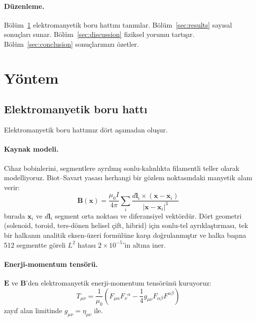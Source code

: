 \documentclass[11pt,a4paper,twocolumn]{article}
\begin{document}
\paragraph{Düzenleme.} Bölüm~\ref{sec:method} elektromanyetik boru
hattını tanımlar. Bölüm~\ref{sec:results} sayısal sonuçları sunar.
Bölüm~\ref{sec:discussion} fiziksel yorumu tartışır.
Bölüm~\ref{sec:conclusion} sonuçlarımızı özetler.

\section{Yöntem}
\label{sec:method}

\subsection{Elektromanyetik boru hattı}
\label{subsec:em}

Elektromanyetik boru hattımız dört aşamadan oluşur.

\paragraph{Kaynak modeli.} Cihaz bobinlerini, segmentlere ayrılmış
sonlu-kalınlıkta filamentli teller olarak modelliyoruz. Biot--Savart
yasası herhangi bir gözlem noktasındaki manyetik alanı verir:
\begin{equation}
\mathbf{B}(\mathbf{x}) = \frac{\mu_0 I}{4\pi} \sum_i
\frac{d\mathbf{l}_i \times (\mathbf{x} - \mathbf{x}_i)}
{|\mathbf{x} - \mathbf{x}_i|^3}
\end{equation}
burada $\mathbf{x}_i$ ve $d\mathbf{l}_i$ segment orta noktası ve
diferansiyel vektördür. Dört geometri (solenoid, toroid, ters-dönen
helisel çift, hibrid) için sonlu-tel ayrıklaştırması, tek bir
halkanın analitik eksen-üzeri formülüne karşı doğrulanmıştır ve
halka başına 512 segmentte göreli $L^2$ hatası
$2\times 10^{-5}$'in altına iner.

\paragraph{Enerji-momentum tensörü.} $\mathbf{E}$ ve
$\mathbf{B}$'den elektromanyetik enerji-momentum tensörünü
kuruyoruz:
\begin{equation}
T_{\mu\nu} = \frac{1}{\mu_0}\left(F_{\mu\alpha}F_\nu{}^\alpha
- \frac{1}{4} g_{\mu\nu} F_{\alpha\beta}F^{\alpha\beta}\right)
\end{equation}
zayıf alan limitinde $g_{\mu\nu} = \eta_{\mu\nu}$ ile.
\end{document}
